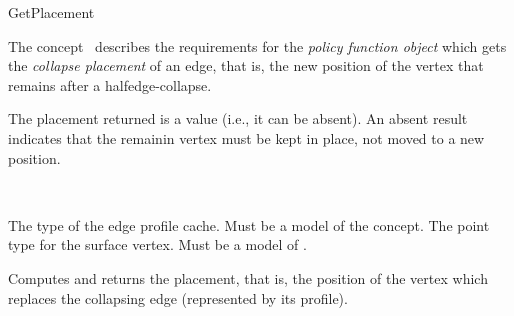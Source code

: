 
\begin{ccRefFunctionObjectConcept}{GetPlacement}


\ccDefinition

The concept \ccRefName\ describes the requirements for the {\em policy
function object} which gets the {\em collapse placement} of an edge,
that is, the new position of the vertex that remains after a 
halfedge-collapse.

The placement returned is a  value (i.e., it can
be absent). An absent result indicates that the remainin vertex 
must be kept in place, not moved to a new position.

\ccRefines
{}\\

\ccTypes
  {The type of the edge profile cache. Must be a model of the  concept.}{}
\ccGlue    
  {The point type for the surface vertex.  Must be a model of .}
\ccGlue    


\ccOperations

  {Computes and returns the placement, that is, the position of the vertex 
  which replaces the collapsing edge (represented by its profile).}
  
\ccHasModels
{}\\

\end{ccRefFunctionObjectConcept}

